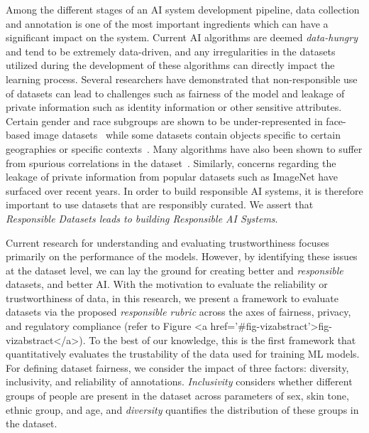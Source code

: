 \documentclass[journal]{IEEEtran}
\begin{document}
Among the different stages of an AI system development pipeline, data collection and annotation is one of the most important ingredients which can have a significant impact on the system. Current AI algorithms are deemed \textit{data-hungry} and tend to be extremely data-driven, and any irregularities in the datasets utilized during the development of these algorithms can directly impact the learning process. Several researchers have demonstrated that non-responsible use of datasets can lead to challenges such as fairness of the model and leakage of private information such as identity information or other sensitive attributes. Certain gender and race subgroups are shown to be under-represented in face-based image datasets~\cite{cao2018vggface2,yi2014learning} while some datasets contain objects specific to certain geographies or specific contexts~\cite{deng2009imagenet,rojasdollar}. Many algorithms have also been shown to suffer from spurious correlations in the dataset~\cite{geirhos2020shortcut,li2022whac,mehta2022you}. Similarly, concerns regarding the leakage of private information from popular datasets such as ImageNet have surfaced over recent years. In order to build responsible AI systems, it is therefore important to use datasets that are responsibly curated. We assert that \textit{Responsible Datasets leads to building Responsible AI Systems}. 

Current research for understanding and evaluating trustworthiness focuses primarily on the performance of the models. However, by identifying these issues at the dataset level, we can lay the ground for creating better and \textit{responsible} datasets, and better AI. With the motivation to evaluate the reliability or trustworthiness of data, in this research, we present a framework to evaluate datasets via the proposed \textit{responsible rubric} across the axes of fairness, privacy, and regulatory compliance (refer to Figure <a href='#fig-vizabstract'>fig-vizabstract</a>).
To the best of our knowledge, this is the first framework that quantitatively evaluates the trustability of the data used for training ML models. For defining dataset fairness, we consider the impact of three factors: diversity, inclusivity, and reliability of annotations. \textit{Inclusivity} considers whether different groups of people are present in the dataset across parameters of sex, skin tone, ethnic group, and age, and \textit{diversity} quantifies the distribution of these groups in the dataset.
\end{document}
